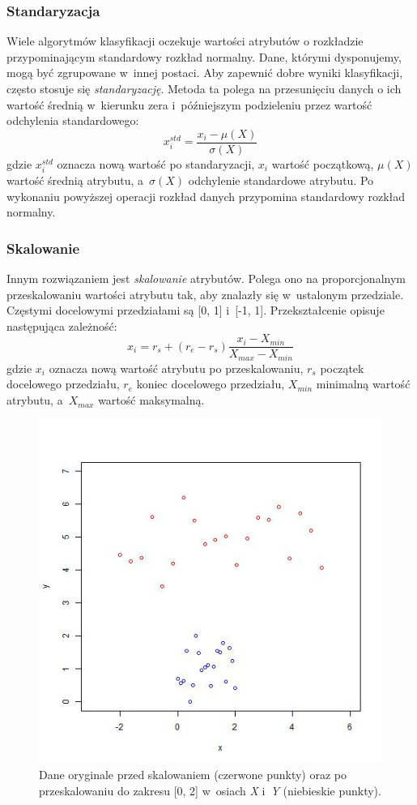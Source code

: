\documentclass[../thesis.tex]{subfiles}
\begin{document}
\subsubsection{Standaryzacja}

Wiele algorytmów klasyfikacji oczekuje wartości atrybutów o rozkładzie przypominającym standardowy rozkład normalny. Dane, którymi dysponujemy, mogą być zgrupowane w~innej postaci. Aby zapewnić dobre wyniki klasyfikacji, często stosuje się \emph{standaryzację}. Metoda ta polega na przesunięciu danych o ich wartość średnią w~kierunku zera i~późniejszym podzieleniu przez wartość odchylenia standardowego:
\[x_i^{std} = \frac{x_i - \mu(X)}{\sigma(X)}\]
gdzie $x_i^{std}$ oznacza nową wartość po standaryzacji, $x_i$ wartość początkową, $\mu(X)$ wartość średnią atrybutu, a~$\sigma(X)$ odchylenie standardowe atrybutu. Po wykonaniu powyższej operacji rozkład danych przypomina standardowy rozkład normalny.

\subsubsection{Skalowanie}

Innym rozwiązaniem jest \emph{skalowanie} atrybutów. Polega ono na proporcjonalnym przeskalowaniu wartości atrybutu tak, aby znalazły się w~ustalonym przedziale. Częstymi docelowymi przedziałami są [0, 1] i~[-1, 1]. Przekształcenie opisuje następująca zależność:
\[x_i = r_s + (r_e - r_s)\frac{x_i - X_{min}}{X_{max} - X_{min}}\]
gdzie $x_i$ oznacza nową wartość atrybutu po przeskalowaniu, $r_s$ początek docelowego przedziału, $r_e$ koniec docelowego przedziału, $X_{min}$ minimalną wartość atrybutu, a~$X_{max}$ wartość maksymalną.

\begin{figure}[h]
\centering
\includegraphics[height=.4\textheight]{scale.jpg}
\caption{Dane oryginale przed skalowaniem (czerwone punkty) oraz po przeskalowaniu do zakresu [0, 2] w~osiach \emph{X} i~\emph{Y} (niebieskie punkty).}
\label{classification:scale}
\end{figure}
\end{document}
